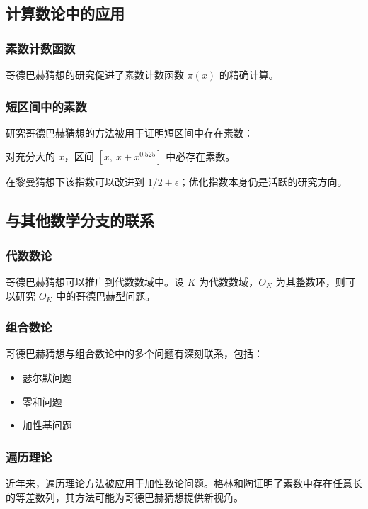 \subsection{计算数论中的应用}

\subsubsection{素数计数函数}

哥德巴赫猜想的研究促进了素数计数函数 $\pi(x)$ 的精确计算。

\subsubsection{短区间中的素数}

研究哥德巴赫猜想的方法被用于证明短区间中存在素数：

\begin{theorem}
    对充分大的 $x$，区间 $[x,\ x + x^{0.525}]$ 中必存在素数。
\end{theorem}

在黎曼猜想下该指数可以改进到 $1/2 + \epsilon$；优化指数本身仍是活跃的研究方向。

\subsection{与其他数学分支的联系}

\subsubsection{代数数论}

哥德巴赫猜想可以推广到代数数域中。设 $K$ 为代数数域，$O_K$ 为其整数环，则可以研究 $O_K$ 中的哥德巴赫型问题。

\subsubsection{组合数论}

哥德巴赫猜想与组合数论中的多个问题有深刻联系，包括：

\begin{itemize}
    \item 瑟尔默问题
    \item 零和问题
    \item 加性基问题
\end{itemize}

\subsubsection{遍历理论}

近年来，遍历理论方法被应用于加性数论问题。格林和陶证明了素数中存在任意长的等差数列，其方法可能为哥德巴赫猜想提供新视角。
